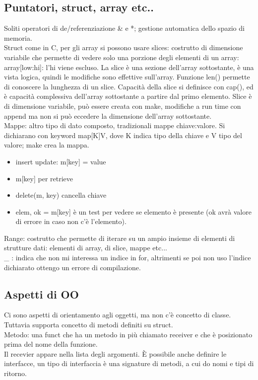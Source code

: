 \documentclass{article}
\begin{document}
\subsection{Puntatori, struct, array etc..}
Soliti operatori di de/referenziazione \& e *; gestione automatica dello spazio di memoria.\\ Struct come in C, per gli array si possono usare slices: costrutto di dimensione variabile che permette di vedere solo una porzione degli elementi di un array: array[low:hi]: l'hi viene escluso. La slice è una sezione dell'array sottostante, è una vista logica, quindi le modifiche sono effettive sull'array. Funzione len() permette di conoscere la lunghezza di un slice. Capacità della slice si definisce con cap(), ed è capacità complessiva dell'array sottostante a partire dal primo elemento. Slice è di dimensione variabile, può essere creata con make, modifiche a run time con append ma non si può eccedere la dimensione dell'array sottostante.\\Mappe: altro tipo di dato composto, tradizionali mappe chiave:valore. Si dichiarano con keyword map[K]V, dove K indica tipo della chiave e V tipo del valore; make crea la mappa.\\ 
\begin{itemize}
\item insert update: m[key] = value
\item m[key] per retrieve
\item delete(m, key) cancella chiave
\item elem, ok = m[key] è un test per vedere se elemento è presente (ok avrà valore di errore in caso non c'è l'elemento).
\end{itemize}
Range: costrutto che permette di iterare su un ampio insieme di elementi di strutture dati: elementi di array, di slice, mappe etc... \\ \_ : indica che non mi interessa un indice in for, altrimenti se poi non uso l'indice dichiarato ottengo un errore di compilazione.
\subsection{Aspetti di OO}
Ci sono aspetti di orientamento agli oggetti, ma non c'è concetto di classe. Tuttavia supporta concetto di metodi definiti su struct.\\ Metodo: una funct che ha un metodo in più chiamato receiver e che è posizionato prima del nome della funzione.\\ Il recevier appare nella lista degli argomenti. È possibile anche definire le interfacce, un tipo di interfaccia è una signature di metodi, a cui do nomi e tipi di ritorno.
\end{document}

